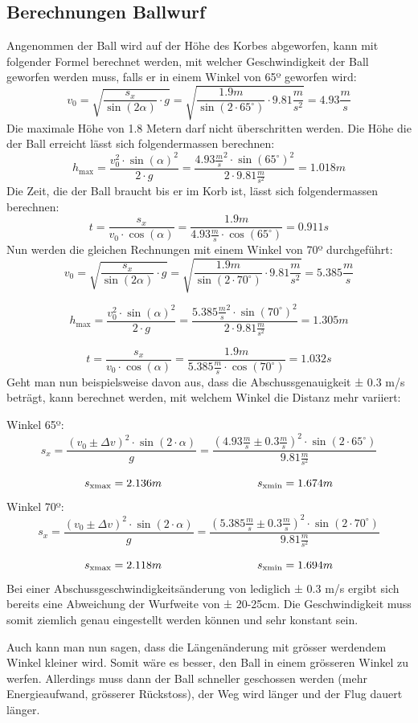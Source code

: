 \subsection{Berechnungen Ballwurf}
Angenommen der Ball wird auf der Höhe des Korbes abgeworfen, kann mit 
folgender Formel berechnet werden, mit welcher Geschwindigkeit der Ball 
geworfen werden muss, falls er in einem Winkel von 65º geworfen wird:
%
\[ v_0 
= \sqrt{ \frac{s_x}{\sin(2\alpha)} \cdot g } 
= \sqrt{ \frac{1.9m}{\sin(2 \cdot 65^\circ)} \cdot 9.81 \frac{m}{s^2}} 
= 4.93 \frac{m}{s} \]
%
Die maximale Höhe von 1.8 Metern darf nicht überschritten werden. Die Höhe die 
der Ball erreicht lässt sich folgendermassen berechnen:
%
\[ h_\text{max} 
= \frac{v_0^2 \cdot \sin(\alpha)^2}{2 \cdot g} 
= \frac{4.93 \frac{m}{s}^2 \cdot \sin(65^\circ)^2}{2 \cdot 9.81 \frac{m}{s^2}} 
= 1.018m \]
%
Die Zeit, die der Ball braucht bis er im Korb ist, lässt sich folgendermassen 
berechnen:
%
\[ t = \frac{s_x}{v_0 \cdot \cos(\alpha)} 
= \frac{1.9m}{4.93 \frac{m}{s} \cdot \cos(65^\circ)} = 0.911s \]
%
Nun werden die gleichen Rechnungen mit einem Winkel von 70º durchgeführt:
%
\[ v_0 = \sqrt{ \frac{s_x}{\sin(2\alpha)} \cdot g } 
= \sqrt{ \frac{1.9m}{\sin(2 \cdot 70^\circ)} \cdot 9.81 \frac{m}{s^2}} 
= 5.385 \frac{m}{s} \]

\[ h_\text{max} = \frac{v_0^2 \cdot \sin(\alpha)^2}{2 \cdot g} 
= \frac{5.385 \frac{m}{s}^2 \cdot \sin(70^\circ)^2}{2 \cdot 9.81 \frac{m}{s^2}} 
= 1.305m \]

\[ t = \frac{s_x}{v_0 \cdot \cos(\alpha)} 
= \frac{1.9m}{5.385 \frac{m}{s} \cdot \cos(70^\circ)} = 1.032s \]
%
Geht man nun beispielsweise davon aus, dass die Abschussgenauigkeit ± 0.3 m/s 
beträgt, kann berechnet werden, mit welchem Winkel die Distanz mehr variiert:

\noindent
Winkel 65º:
%
\[ s_x = \frac{(v_0 \pm \Delta v)^2 \cdot \sin(2 \cdot \alpha)}{g} 
= \frac{(4.93 \frac{m}{s} \pm 0.3 \frac{m}{s})^2 \cdot \sin(2 \cdot 65^\circ)}{9.81 \frac{m}{s^2}} \]

\[ s_\text{xmax} = 2.136m \hspace{30mm} s_\text{xmin} = 1.674m \]
%
Winkel 70º:
%
\[ s_x = \frac{(v_0 \pm \Delta v)^2 \cdot \sin(2 \cdot \alpha)}{g} 
= \frac{(5.385 \frac{m}{s} \pm 0.3 \frac{m}{s})^2 \cdot \sin(2 \cdot 70^\circ)}{9.81 \frac{m}{s^2}} \]

\[ s_\text{xmax} = 2.118m \hspace{30mm} s_\text{xmin} = 1.694m \]
%
Bei einer Abschussgeschwindigkeitsänderung von lediglich ± 0.3 m/s ergibt sich 
bereits eine Abweichung der Wurfweite von ± 20-25cm. Die Geschwindigkeit muss 
somit ziemlich genau eingestellt werden können und sehr konstant sein.

\noindent
Auch kann man nun sagen, dass die Längenänderung mit grösser werdendem Winkel 
kleiner wird. Somit wäre es besser, den Ball in einem grösseren Winkel zu 
werfen. Allerdings muss dann der Ball schneller geschossen werden (mehr 
Energieaufwand, grösserer Rückstoss), der Weg wird länger und der Flug dauert 
länger.
